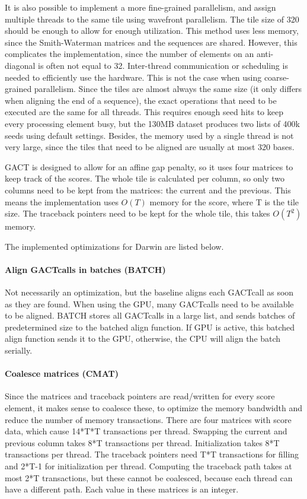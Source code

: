 \documentclass[../thesis.tex]{subfiles}
\begin{document}
It is also possible to implement a more fine-grained parallelism, and assign multiple threads to the same tile using wavefront parallelism.
The tile size of 320 should be enough to allow for enough utilization.
This method uses less memory, since the Smith-Waterman matrices and the sequences are shared.
However, this complicates the implementation, since the number of elements on an anti-diagonal is often not equal to 32.
Inter-thread communication or scheduling is needed to efficiently use the hardware.
This is not the case when using coarse-grained parallelism.
Since the tiles are almost always the same size (it only differs when aligning the end of a sequence), the exact operations that need to be executed are the same for all threads.
This requires enough seed hits to keep every processing element busy, but the 130MB dataset produces two lists of 400k seeds using default settings. 
Besides, the memory used by a single thread is not very large, since the tiles that need to be aligned are usually at most 320 bases.

GACT is designed to allow for an affine gap penalty, so it uses four matrices to keep track of the scores.
The whole tile is calculated per column, so only two columns need to be kept from the matrices: the current and the previous.
This means the implementation uses $O(T)$ memory for the score, where T is the tile size.
The traceback pointers need to be kept for the whole tile, this takes $O(T^2)$ memory.

The implemented optimizations for Darwin are listed below.

\paragraph{Align GACTcalls in batches (BATCH)}
Not necessarily an optimization, but the baseline aligns each GACTcall as soon as they are found.
When using the GPU, many GACTcalls need to be available to be aligned.
BATCH stores all GACTcalls in a large list, and sends batches of predetermined size to the batched align function.
If GPU is active, this batched align function sends it to the GPU, otherwise, the CPU will align the batch serially.

\paragraph{Coalesce matrices (CMAT)}
Since the matrices and traceback pointers are read/written for every score element, it makes sense to coalesce these, to optimize the memory bandwidth and reduce the number of memory transactions.
There are four matrices with score data, which cause 14*T*T transactions per thread.
Swapping the current and previous column takes 8*T transactions per thread. 
Initialization takes 8*T transactions per thread.
The traceback pointers need T*T transactions for filling and 2*T-1 for initialization per thread.
Computing the traceback path takes at most 2*T transactions, but these cannot be coalesced, because each thread can have a different path.
Each value in these matrices is an integer.
\end{document}
